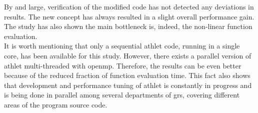 By and large, verification of the modified code has not detected any deviations in results. The new concept has always resulted in a slight overall performance gain. The study has also shown the main bottleneck is, indeed, the non-linear function evaluation.\\


It is worth mentioning that only a sequential \acrshort{athlet} code, running in a single core, has been available for this study. However, there exists a parallel version of \acrshort{athlet} multi-threaded with \acrshort{openmp}. Therefore, the results can be even better because of the reduced fraction of function evaluation time. This fact also shows that development and performance tuning of \acrshort{athlet} is constantly in progress and is being done in parallel among several departments of \acrshort{grs}, covering different areas of the program source code.\\


